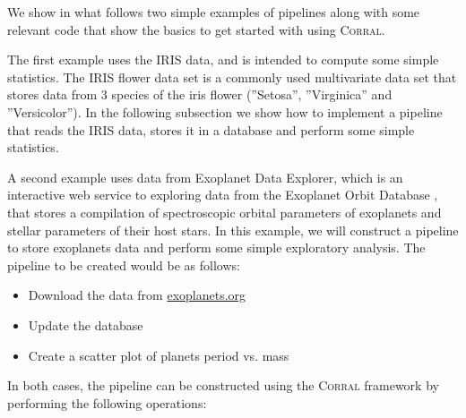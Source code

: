 \documentclass[final,5p,times,twocolumn,authoryear]{elsarticle}
\begin{document}
We show in what follows two simple examples of pipelines along with
some relevant code that show the basics
to get started with using \textsc{Corral}.

The first example uses the IRIS data, and is intended to compute some
simple statistics.
%
The IRIS flower data set \citep{fisher1936} is a commonly used multivariate
data set that stores data from 3 species of the iris flower
(''Setosa'', ''Virginica'' and ''Versicolor'').
%
In the following subsection we show how to implement a pipeline that
reads the IRIS data, stores it in a database and perform some simple
statistics.



A second example uses data from Exoplanet Data Explorer, which is an
interactive web service to exploring data from the Exoplanet Orbit
Database \citep{hann2014}, that stores a compilation of
spectroscopic orbital parameters of exoplanets and stellar parameters of their host
stars.
%
In this example, we will construct a pipeline to store exoplanets data
and perform some simple exploratory analysis.
%
The pipeline to be created would be as follows:
\begin{itemize}
   \item Download the data from \url{exoplanets.org}
   \item Update the database
   \item Create a scatter plot of planets period vs. mass
\end{itemize}

In both cases, the pipeline can be constructed using the
\textsc{Corral} framework by performing the following operations:
\end{document}
